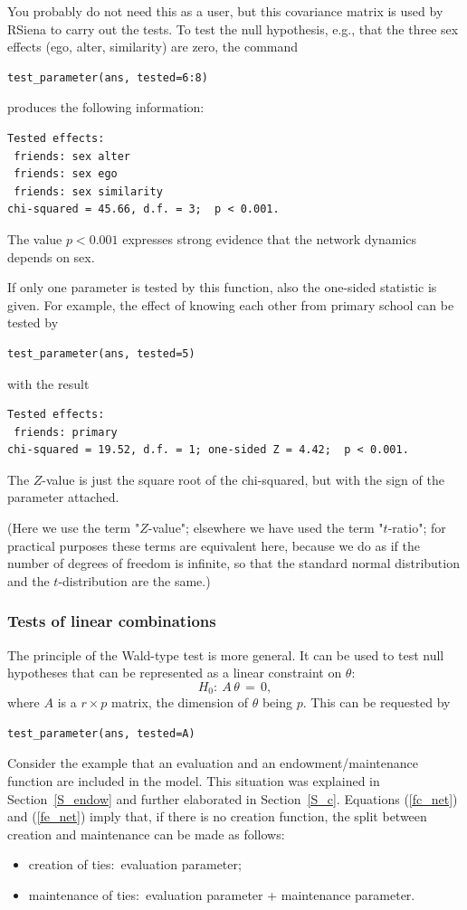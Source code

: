 \documentclass[a4paper,fleqn,11pt]{article}
\newcommand{\+}{\, + \,}
\newcommand{\RS}{{\sf \textsf{RSiena} }}
\begin{document}
You probably do not need this as a user, but this covariance matrix
is used by \RS to carry out the tests.
To test the null hypothesis, e.g., that the three sex effects
(ego, alter, similarity) are zero, the command
\begin{verbatim}
test_parameter(ans, tested=6:8)
\end{verbatim}
produces the following information:
\begin{verbatim}
Tested effects:
 friends: sex alter
 friends: sex ego
 friends: sex similarity
chi-squared = 45.66, d.f. = 3;  p < 0.001.
\end{verbatim}
The value $p < 0.001$ expresses strong evidence
that the network dynamics depends on sex.
\medskip

If only one parameter is tested by this function, also the
one-sided statistic is given. For example, the effect
of knowing each other from primary school can be tested by
\begin{verbatim}
test_parameter(ans, tested=5)
\end{verbatim}
with the result
\begin{verbatim}
Tested effects:
 friends: primary
chi-squared = 19.52, d.f. = 1; one-sided Z = 4.42;  p < 0.001.
\end{verbatim}
The $Z$-value is just the square root of the chi-squared,
but with the sign of the parameter attached.

(Here we use the term "$Z$-value"; elsewhere we have used the term "$t$-ratio";
for practical purposes these terms are equivalent here,
because we do as if the number of degrees of freedom is infinite, so
that the standard normal distribution and the $t$-distribution are the same.)

\subsubsection{Tests of linear combinations}

The principle of the Wald-type test is more general.
It can be used to test  null hypotheses that
can be represented as a linear constraint on $\theta$:
\[
H_0 : \ A\,\theta \,=\, 0 ,
\]
where $A$ is a $r \times p$ matrix, the dimension of $\theta$ being $p$.
This can be requested by
\begin{verbatim}
test_parameter(ans, tested=A)
\end{verbatim}

Consider the example that an evaluation and an endowment/maintenance function
are included in the model.
This situation was explained in Section~\ref{S_endow} and
further elaborated in Section~\ref{S_c}.
Equations (\ref{fc_net}) and (\ref{fe_net}) imply that,
if there is no creation function,
the split between creation and maintenance can be made as follows:
\begin{itemize}
\item creation of ties:\  evaluation parameter;
\item maintenance of ties:\ evaluation parameter + maintenance parameter.
\end{itemize}
\end{document}
